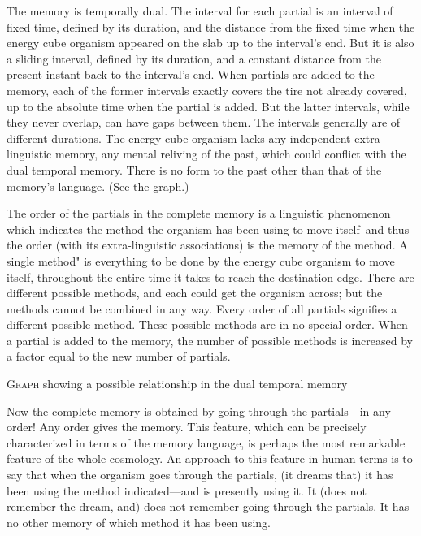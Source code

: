 \documentclass[10pt,twoside,draft]{memoir}
\begin{document}
{{The memory is temporally dual. The interval for each partial is an 
interval of fixed time, defined by its duration, and the distance from the 
fixed time when the energy cube organism appeared on the slab up to the 
interval's end. But it is also a sliding interval, defined by its duration, and a 
constant distance from the present instant back to the interval's end. When 
partials are added to the memory, each of the former intervals exactly covers 
the tire not already covered, up to the absolute time when the partial is 
added. But the latter intervals, while they never overlap, can have gaps 
between them. The intervals generally are of different durations. The energy 
cube organism lacks any independent extra-linguistic memory, any mental 
reliving of the past, which could conflict with the dual temporal memory. 
There is no form to the past other than that of the memory's language. (See 
the graph.) 

The order of the partials in the complete memory is a linguistic 
phenomenon which indicates the method the organism has been using to 
move itself--and thus the order (with its extra-linguistic associations) is the 
memory of the method. A single method" is everything to be done by the 
energy cube organism to move itself, throughout the entire time it takes to 
reach the destination edge. There are different possible methods, and each 
could get the organism across; but the methods cannot be combined in any 
way. Every order of all partials signifies a different possible method. These 
possible methods are in no special order. When a partial is added to the 
memory, the number of possible methods is increased by a factor equal to 
the new number of partials. 


{
	\centering
	\textsc{Graph} showing a possible relationship in the dual temporal memory 
	\par
}


Now the complete memory is obtained by going through the partials---in 
any order! Any order gives the memory. This feature, which can be 
precisely characterized in terms of the memory language, is perhaps the most 
remarkable feature of the whole cosmology. An approach to this feature in 
human terms is to say that when the organism goes through the partials, (it 
dreams that) it has been using the method indicated---and is presently using 
it. It (does not remember the dream, and) does not remember going through 
the partials. It has no other memory of which method it has been using. 

}}
\end{document}
